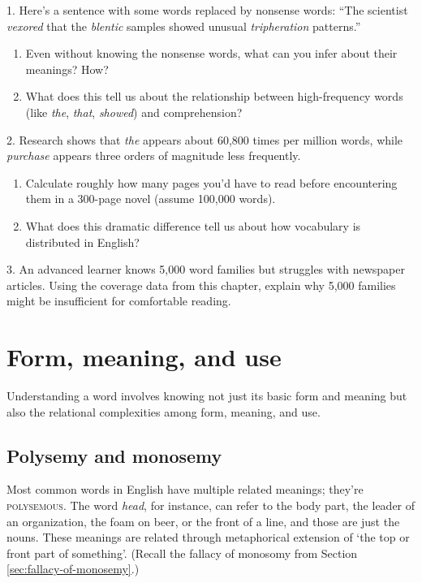 \begin{tcolorbox}[title=Exercise: Frequency and Comprehension, colback=white, colframe=green!75!black, fonttitle=\bfseries]
1. Here's a sentence with some words replaced by nonsense words:
 ``The scientist \textit{vexored} that the \textit{blentic} samples showed unusual \textit{tripheration} patterns.''
 \begin{enumerate}[nosep]
 \item Even without knowing the nonsense words, what can you infer about their meanings? How?
 \item What does this tell us about the relationship between high-frequency words (like \textit{the}, \textit{that}, \textit{showed}) and comprehension?
 \end{enumerate}

2. Research shows that \textit{the} appears about 60,800 times per million words, while \textit{purchase} appears three orders of magnitude less frequently.
 \begin{enumerate}[nosep]
 \item Calculate roughly how many pages you'd have to read before encountering them in a 300-page novel (assume 100,000 words).
 \item What does this dramatic difference tell us about how vocabulary is distributed in English?
 \end{enumerate}

3. An advanced learner knows 5,000 word families but struggles with newspaper articles. Using the coverage data from this chapter, explain why 5,000 families might be insufficient for comfortable reading.
\end{tcolorbox}

\section{Form, meaning, and use} \label{sec:form-meaning-use}

Understanding a word involves knowing not just its basic form and meaning but also the relational complexities among form, meaning, and use.

\subsection{Polysemy and monosemy} \label{sec:polysemy}

Most common words in English have multiple related meanings; they're \textsc{polysemous}. The word \textit{head}, for instance, can refer to the body part, the leader of an organization, the foam on beer, or the front of a line, and those are just the nouns. These meanings are related through metaphorical extension of `the top or front part of something'. (Recall the fallacy of monosomy from Section \ref{sec:fallacy-of-monosemy}.)

